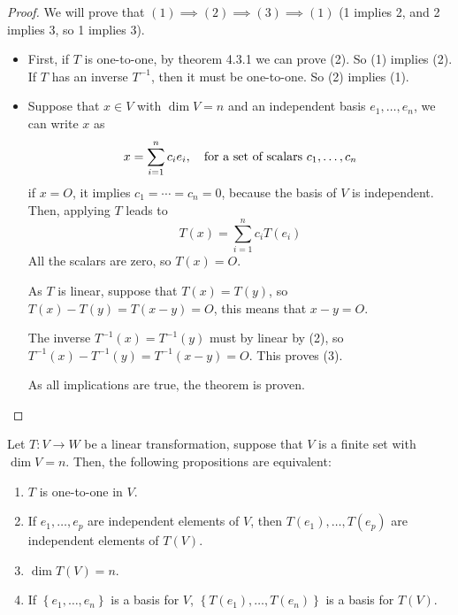 \documentclass[../linear-spaces.tex]{subfiles}
\begin{document}
\begin{proof}
    We will prove that $(1)\implies (2) \implies (3) \implies (1)$ (1 implies 2, and 2 implies 3, so 1 implies 3).

    \begin{itemize}
        \item First, if $T$ is one-to-one, by theorem 4.3.1 we can prove (2). So (1) implies
              (2). If $T$ has an inverse $T^{-1}$, then it must be one-to-one. So (2) implies
              (1).
        \item Suppose that $x\in V$ with $\dim V = n$ and an independent basis
              $e_1,\dots,e_n$, we can write $x$ as
              \begin{equation*}
                  x=\sum_{i=1}^{n}{c_i e_i}, \quad \textnormal{for a set of scalars }c_1,\dots,c_n
              \end{equation*}
              if $x=O$, it implies $c_1=\cdots=c_n=0$, because the basis of $V$ is independent. Then, applying $T$ leads to
              \begin{equation*}
                  T(x)=\sum_{i=1}^{n}{c_i T(e_i)}
              \end{equation*}
              All the scalars are zero, so $T(x) = O$.

              As $T$ is linear, suppose that $T(x) = T(y)$, so $T(x) - T(y)= T(x-y) = O$,
              this means that $x-y=O$.

              The inverse $T^{-1}(x) = T^{-1}(y)$ must by linear by (2), so $T^{-1}(x) -
                  T^{-1}(y) = T^{-1}(x-y)=O$. This proves (3).

              As all implications are true, the theorem is proven.
    \end{itemize}
\end{proof}

\begin{theorem}
    Let $T: V\to W$ be a linear transformation, suppose that $V$ is a finite set with $\dim V = n$.
    Then, the following propositions are equivalent:

    \begin{enumerate}
        \item $T$ is one-to-one in $V$.
        \item If $e_1,\dots,e_p$ are independent elements of $V$, then $T(e_1),\dots, T(e_p)$
              are independent elements of $T(V)$.
        \item $\dim T(V) = n$.
        \item If $\left\{e_1,\dots, e_n\right\}$ is a basis for $V$, $\left\{T(e_1),\dots,
                  T(e_n)\right\}$ is a basis for $T(V)$.
    \end{enumerate}

\end{theorem}
\end{document}

